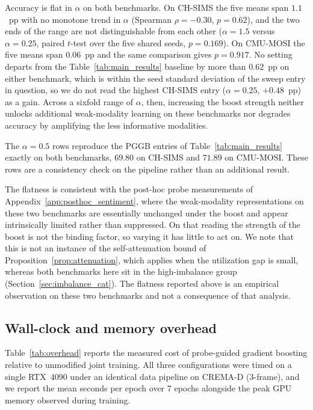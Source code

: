 \documentclass{article}
\begin{document}
Accuracy is flat in $\alpha$ on both benchmarks. On CH-SIMS the five means span $1.1$~pp with no monotone trend in $\alpha$ (Spearman $\rho = -0.30$, $p = 0.62$), and the two ends of the range are not distinguishable from each other ($\alpha{=}1.5$ versus $\alpha{=}0.25$, paired $t$-test over the five shared seeds, $p = 0.169$). On CMU-MOSI the five means span $0.06$~pp and the same comparison gives $p = 0.917$. No setting departs from the Table~\ref{tab:main_results} baseline by more than $0.62$~pp on either benchmark, which is within the seed standard deviation of the sweep entry in question, so we do not read the highest CH-SIMS entry ($\alpha{=}0.25$, $+0.48$~pp) as a gain. Across a sixfold range of $\alpha$, then, increasing the boost strength neither unlocks additional weak-modality learning on these benchmarks nor degrades accuracy by amplifying the less informative modalities.

The $\alpha{=}0.5$ rows reproduce the PGGB entries of Table~\ref{tab:main_results} exactly on both benchmarks, $69.80$ on CH-SIMS and $71.89$ on CMU-MOSI. These rows are a consistency check on the pipeline rather than an additional result.

The flatness is consistent with the post-hoc probe measurements of Appendix~\ref{app:posthoc_sentiment}, where the weak-modality representations on these two benchmarks are essentially unchanged under the boost and appear intrinsically limited rather than suppressed. On that reading the strength of the boost is not the binding factor, so varying it has little to act on. We note that this is not an instance of the self-attenuation bound of Proposition~\ref{prop:attenuation}, which applies when the utilization gap is small, whereas both benchmarks here sit in the high-imbalance group (Section~\ref{sec:imbalance_cat}). The flatness reported above is an empirical observation on these two benchmarks and not a consequence of that analysis.

\subsection{Wall-clock and memory overhead}
\label{app:overhead}

Table~\ref{tab:overhead} reports the measured cost of probe-guided gradient boosting relative to unmodified joint training. All three configurations were timed on a single RTX~4090 under an identical data pipeline on CREMA-D (3-frame), and we report the mean seconds per epoch over 7 epochs alongside the peak GPU memory observed during training.
\end{document}
